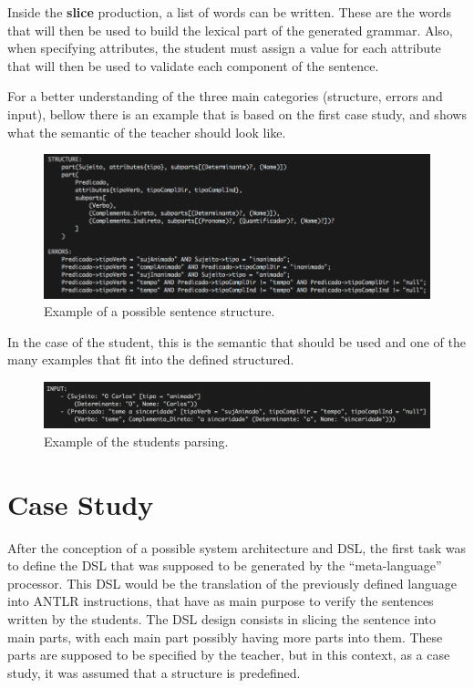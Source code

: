 Inside the \textbf{slice} production, a list of words can be written. These are the words that will then be used to build the lexical part of the generated grammar. Also, when specifying attributes, the student must assign a value for each attribute that will then be used to validate each component of the sentence.

For a better understanding of the three main categories (structure, errors and input), bellow there is an example that is based on the first case study, and shows what the semantic of the teacher should look like.

\begin{figure}[h]
    \centering
    \includegraphics[width=15cm]{images/phrase_meta_grammar.png}
    \caption{Example of a possible sentence structure.}
    \label{fig:meta_grammar_teacher}
\end{figure}

In the case of the student, this is the semantic that should be used and one of the many examples that fit into the defined structured.

\begin{figure}[h]
    \centering
    \includegraphics[width=15cm]{images/INPUT_meta_grammar_example.png}
    \caption{Example of the students parsing.}
    \label{fig:meta_grammar_student}
\end{figure}

\section{Case Study}
After the conception of a possible system architecture and DSL, the first task was to define the \textsc{DSL} that was supposed to be generated by the ``meta-language'' processor. This \textsc{DSL} would be the translation of the previously defined language into \textsc{ANTLR} instructions, that have as main purpose to verify the sentences written by the students. The \textsc{DSL} design consists in slicing the sentence into main parts, with each main part possibly having more parts into them. These parts are supposed to be specified by the teacher, but in this context, as a case study, it was assumed that a structure is predefined.

